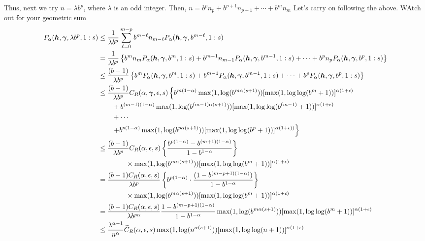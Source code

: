 \documentclass{amsart}
\newcommand{\FredNote}[1]{{\color{blue}#1}}
\begin{document}
Thus, next we try $n = \lambda b^p$, where $\lambda$ is an odd integer. Then, $n = b^pn_p + b^{p+1}n_{p+1} + \cdots + b^m n_m$
\FredNote{Let's carry on following the above.  WAtch out for your geometric sum} \\
\begin{align*}
    P_\alpha(\boldsymbol{h},\boldsymbol{\gamma},\lambda b^p,1:s)
    & \le \frac {1}{\lambda b^p} \sum_{\ell = 0}^{m-p} b^{m-\ell} n_{m -\ell} P_\alpha(\boldsymbol{h},\boldsymbol{\gamma},b^{m-\ell},1:s) \\
    &= \frac {1}{\lambda b^p} \left\{b^m n_m P_\alpha(\boldsymbol{h},\boldsymbol{\gamma},b^m,1:s) + b^{m-1} n_{m-1} P_\alpha(\boldsymbol{h},\boldsymbol{\gamma},b^{m-1},1:s) + \cdots + b^p n_p P_\alpha(\boldsymbol{h},\boldsymbol{\gamma},b^p,1:s) 
    \right\} \\ 
    & \le \frac {(b-1)}{\lambda b^p} \left\{b^m  P_\alpha(\boldsymbol{h},\boldsymbol{\gamma},b^m,1:s) + b^{m-1}  P_\alpha(\boldsymbol{h},\boldsymbol{\gamma},b^{m-1},1:s) + \cdots + b^p  P_\alpha(\boldsymbol{h},\boldsymbol{\gamma},b^p,1:s) 
    \right\} \\ 
    & \le \frac {(b-1)}{\lambda b^p} C_{R}(\alpha,\boldsymbol{\gamma},\epsilon,s) \left\{ b^{m(1-\alpha)}\max(1, \log(b^{m\alpha(s+1)})) [\max(1,\log \log (
    b^m+1))]^{\alpha(1+\epsilon)}\right .\\ 
    & \qquad  + b^{(m-1)(1-\alpha)}\max(1, \log(b^{(m-1)\alpha(s+1)})) [\max(1,\log \log (
    b^{(m-1)}+1))]^{\alpha(1+\epsilon)}\\
      &  \qquad + \cdots \\
      & \qquad  \left . +   b^{p(1-\alpha)}\max(1,\log(b^{p\alpha(s+1)})) [\max(1,\log \log (b^p+1))]^{\alpha(1+\epsilon))}  \right\}\\
    & \le \frac {(b-1)}{\lambda b^p} C_{R}(\alpha,\epsilon,s) 
    \left\{\frac{b^{p(1-\alpha)} - b^{(m+1)(1- \alpha )}}{1 - b^{1 -\alpha}}\right\} \\
     & \qquad \qquad \times \max(1, \log(b^{m\alpha(s+1)})) [\max(1,\log \log (
    b^m+1))]^{\alpha(1+\epsilon)} \\
    & = \frac { (b-1) C_{R}(\alpha,\epsilon,s)}{\lambda b^p} \left\{ b^{p(1-\alpha)} \cdot \frac{(1 - b^{(m-p+1)(1- \alpha )})}{1 - b^{1- \alpha}}\right\} \\
    & \qquad \qquad \times \max(1, \log(b^{m\alpha(s+1)})) [\max(1,\log \log (
    b^m+1))]^{\alpha(1+\epsilon)} \\
    &=  \frac {(b-1)C_{R}(\alpha,\epsilon,s)}{\lambda b^{p\alpha}}  \frac{1 - b^{(m-p+1)(1- \alpha )}}{1 - b^{1- \alpha}} \max(1, \log(b^{m\alpha(s+1)})) [\max(1,\log \log (
    b^m+1))]^{\alpha(1+\epsilon)} \\
    &\le \frac{\lambda^{\alpha -1}}{n^{\alpha}} \widetilde{C}_{R}(\alpha,\epsilon,s)  \max(1, \log(n^{\alpha(s+1)})) [\max(1,\log \log (
    n+1))]^{\alpha(1+\epsilon)} \\ 
\end{align*}
\end{document}
